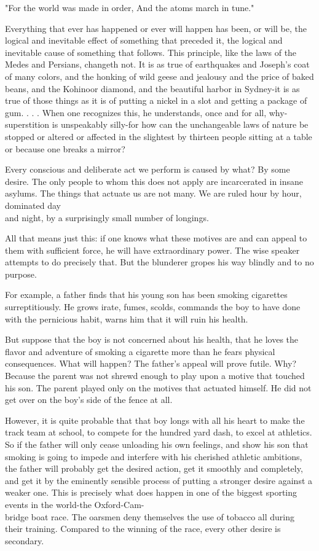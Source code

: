 \documentclass[10pt]{article}
\begin{document}
\begin{displayquote}
"For the world was made in order, And the atoms march in tune."
\end{displayquote}

Everything that ever has happened or ever will happen has been, or will be, the logical and inevitable effect of something that preceded it, the logical and inevitable cause of something that follows. This principle, like the laws of the Medes and Persians, changeth not. It is as true of earthquakes and Joseph's coat of many colors, and the honking of wild geese and jealousy and the price of baked beans, and the Kohinoor diamond, and the beautiful harbor in Sydney-it is as true of those things as it is of putting a nickel in a slot and getting a package of gum. . . . When one recognizes this, he understands, once and for all, why-superstition is unspeakably silly-for how can the unchangeable laws of nature be stopped or altered or affected in the slightest by thirteen people sitting at a table or because one breaks a mirror?

Every conscious and deliberate act we perform is caused by what? By some desire. The only people to whom this does not apply are incarcerated in insane asylums. The things that actuate us are not many. We are ruled hour by hour, dominated day\\
and night, by a surprisingly small number of longings.

All that means just this: if one knows what these motives are and can appeal to them with sufficient force, he will have extraordinary power. The wise speaker attempts to do precisely that. But the blunderer gropes his way blindly and to no purpose.

For example, a father finds that his young son has been smoking cigarettes surreptitiously. He grows irate, fumes, scolds, commands the boy to have done with the pernicious habit, warns him that it will ruin his health.

But suppose that the boy is not concerned about his health, that he loves the flavor and adventure of smoking a cigarette more than he fears physical consequences. What will happen? The father's appeal will prove futile. Why? Because the parent was not shrewd enough to play upon a motive that touched his son. The parent played only on the motives that actuated himself. He did not get over on the boy's side of the fence at all.

However, it is quite probable that that boy longs with all his heart to make the track team at school, to compete for the hundred yard dash, to excel at athletics. So if the father will only cease unloading his own feelings, and show his son that smoking is going to impede and interfere with his cherished athletic ambitions, the father will probably get the desired action, get it smoothly and completely, and get it by the eminently sensible process of putting a stronger desire against a weaker one. This is precisely what does happen in one of the biggest sporting events in the world-the Oxford-Cam-\\
bridge boat race. The oarsmen deny themselves the use of tobacco all during their training. Compared to the winning of the race, every other desire is secondary.
\end{document}
